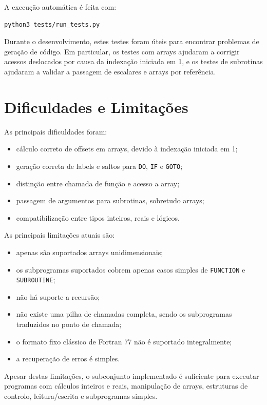 \documentclass[11pt,a4paper]{article}
\begin{document}
A execução automática é feita com:

\begin{lstlisting}
python3 tests/run_tests.py
\end{lstlisting}

Durante o desenvolvimento, estes testes foram úteis para encontrar problemas de geração de código. Em particular, os testes com arrays ajudaram a corrigir acessos deslocados por causa da indexação iniciada em 1, e os testes de subrotinas ajudaram a validar a passagem de escalares e arrays por referência.

\section{Dificuldades e Limitações}

As principais dificuldades foram:

\begin{itemize}
    \item cálculo correto de offsets em arrays, devido à indexação iniciada em 1;
    \item geração correta de labels e saltos para \texttt{DO}, \texttt{IF} e \texttt{GOTO};
    \item distinção entre chamada de função e acesso a array;
    \item passagem de argumentos para subrotinas, sobretudo arrays;
    \item compatibilização entre tipos inteiros, reais e lógicos.
\end{itemize}

As principais limitações atuais são:

\begin{itemize}
    \item apenas são suportados arrays unidimensionais;
    \item os subprogramas suportados cobrem apenas casos simples de \texttt{FUNCTION} e \texttt{SUBROUTINE};
    \item não há suporte a recursão;
    \item não existe uma pilha de chamadas completa, sendo os subprogramas traduzidos no ponto de chamada;
    \item o formato fixo clássico de Fortran 77 não é suportado integralmente;
    \item a recuperação de erros é simples.
\end{itemize}

Apesar destas limitações, o subconjunto implementado é suficiente para executar programas com cálculos inteiros e reais, manipulação de arrays, estruturas de controlo, leitura/escrita e subprogramas simples.
\end{document}
